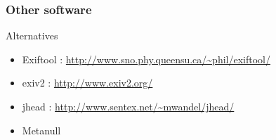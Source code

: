 \documentclass{beamer}
\begin{document}
\begin{frame}
\frametitle{Other software}

\begin{block}{Alternatives}
\begin{itemize}
\item Exiftool : \url{http://www.sno.phy.queensu.ca/~phil/exiftool/}
\item exiv2 : \url{http://www.exiv2.org/}
\item jhead : \url{http://www.sentex.net/~mwandel/jhead/}
\item Metanull
\end{itemize}
\end{block}
\end{frame}
\end{document}
